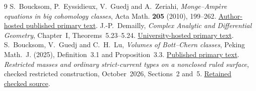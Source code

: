 \documentclass[11pt]{article}
\begin{document}
\begin{thebibliography}{9}
 S.~Boucksom, P.~Eyssidieux, V.~Guedj and A.~Zeriahi,
\emph{Monge--Amp\`ere equations in big cohomology classes},
Acta Math. \textbf{205} (2010), 199--262.
\href{https://www.math.univ-toulouse.fr/~guedj/fichierspdf/BEGZ10.pdf}{Author-hosted published primary text}.
 J.-P.~Demailly, \emph{Complex Analytic and Differential
Geometry}, Chapter~I, Theorems~5.23--5.24.
\href{https://www-fourier.univ-grenoble-alpes.fr/~demailly/manuscripts/agbook.pdf}{University-hosted primary text}.
 S.~Boucksom, V.~Guedj and C.~H.~Lu,
\emph{Volumes of Bott--Chern classes}, Peking Math.~J. (2025),
Definition~3.1 and Proposition~3.3.
\href{https://d-nb.info/1374372846/34}{Published primary text}.
 \emph{Restricted masses and ordinary strict-current types
on a nonclosed ruled surface}, checked restricted construction, October~2026,
Sections~2 and~5.
\href{https://github.com/MingchenXia/non-kahler-pluripotential-theory/blob/2ec45dec6172ced6e2af18b2b5fe657c07aeee9e/research/papers/S11-nonclosed-ruled-restricted-masses-and-strict-types.tex}{Retained checked source}.
\end{thebibliography}
\end{document}
